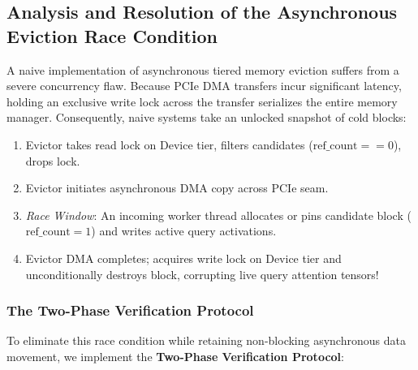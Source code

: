 \documentclass[10pt,twocolumn,letterpaper]{article}
\begin{document}
\subsection{Analysis and Resolution of the Asynchronous Eviction Race Condition}
A naive implementation of asynchronous tiered memory eviction suffers from a severe concurrency flaw. Because PCIe DMA transfers incur significant latency, holding an exclusive write lock across the transfer serializes the entire memory manager. Consequently, naive systems take an unlocked snapshot of cold blocks:
\begin{enumerate}
    \item Evictor takes read lock on Device tier, filters candidates ($\text{ref\_count} == 0$), drops lock.
    \item Evictor initiates asynchronous DMA copy across PCIe seam.
    \item \textit{Race Window}: An incoming worker thread allocates or pins candidate block ($\text{ref\_count} = 1$) and writes active query activations.
    \item Evictor DMA completes; acquires write lock on Device tier and unconditionally destroys block, corrupting live query attention tensors!
\end{enumerate}

\subsubsection{The Two-Phase Verification Protocol}
To eliminate this race condition while retaining non-blocking asynchronous data movement, we implement the \textbf{Two-Phase Verification Protocol}:
\end{document}
